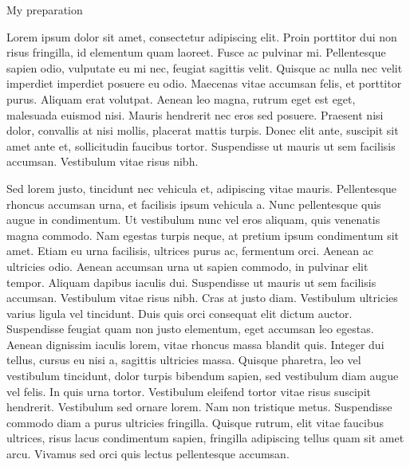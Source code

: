 \documentclass[10pt,a4paper]{article} %
\newcommand{\NewsItem}[1]{ %
\usefont{T1}{fvs}{n}{n} %
\vspace{24pt}\large #1\vspace{3pt} %
\par \normalsize \normalfont}
\begin{document}
\begin{multicols}{3} %


\NewsItem{My preparation}

Lorem ipsum dolor sit amet, consectetur adipiscing elit. Proin porttitor dui non risus fringilla, id elementum quam laoreet. Fusce ac pulvinar mi. Pellentesque sapien odio, vulputate eu mi nec, feugiat sagittis velit. Quisque ac nulla nec velit imperdiet imperdiet posuere eu odio. Maecenas vitae accumsan felis, et porttitor purus. Aliquam erat volutpat. Aenean leo magna, rutrum eget est eget, malesuada euismod nisi. Mauris hendrerit nec eros sed posuere. Praesent nisi dolor, convallis at nisi mollis, placerat mattis turpis. Donec elit ante, suscipit sit amet ante et, sollicitudin faucibus tortor. Suspendisse ut mauris ut sem facilisis accumsan. Vestibulum vitae risus nibh. 

Sed lorem justo, tincidunt nec vehicula et, adipiscing vitae mauris. Pellentesque rhoncus accumsan urna, et facilisis ipsum vehicula a. Nunc pellentesque quis augue in condimentum. Ut vestibulum nunc vel eros aliquam, quis venenatis magna commodo. Nam egestas turpis neque, at pretium ipsum condimentum sit amet. Etiam eu urna facilisis, ultrices purus ac, fermentum orci. Aenean ac ultricies odio. Aenean accumsan urna ut sapien commodo, in pulvinar elit tempor. Aliquam dapibus iaculis dui. Suspendisse ut mauris ut sem facilisis accumsan. Vestibulum vitae risus nibh. Cras at justo diam. Vestibulum ultricies varius ligula vel tincidunt. Duis quis orci consequat elit dictum auctor. Suspendisse feugiat quam non justo elementum, eget accumsan leo egestas. Aenean dignissim iaculis lorem, vitae rhoncus massa blandit quis. Integer dui tellus, cursus eu nisi a, sagittis ultricies massa. Quisque pharetra, leo vel vestibulum tincidunt, dolor turpis bibendum sapien, sed vestibulum diam augue vel felis. In quis urna tortor. Vestibulum eleifend tortor vitae risus suscipit hendrerit. Vestibulum sed ornare lorem. Nam non tristique metus. Suspendisse commodo diam a purus ultricies fringilla. Quisque rutrum, elit vitae faucibus ultrices, risus lacus condimentum sapien, fringilla adipiscing tellus quam sit amet arcu. Vivamus sed orci quis lectus pellentesque accumsan.


\end{multicols}
\end{document}
